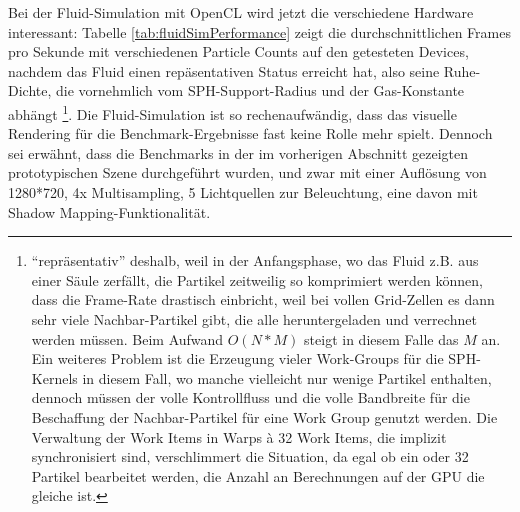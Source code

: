 	Bei der Fluid-Simulation mit OpenCL wird jetzt die verschiedene Hardware interessant:
	Tabelle \ref{tab:fluidSimPerformance} zeigt die durchschnittlichen Frames pro Sekunde
	mit verschiedenen Particle Counts auf den getesteten Devices, nachdem das Fluid einen repäsentativen
	Status erreicht hat, also seine Ruhe-Dichte, die vornehmlich vom SPH-Support-Radius und der Gas-Konstante abhängt
	\footnote{"`repräsentativ"' deshalb, weil in der Anfangsphase, wo das Fluid z.B. aus einer Säule zerfällt, die Partikel
	zeitweilig so komprimiert werden können, dass die Frame-Rate drastisch einbricht, weil bei vollen Grid-Zellen
	es dann sehr viele Nachbar-Partikel gibt, die alle heruntergeladen und verrechnet werden müssen.
	Beim Aufwand $O(N*M)$ steigt in diesem Falle das $M$ an. Ein weiteres Problem ist die Erzeugung vieler Work-Groups
	für die SPH-Kernels in diesem Fall, wo manche vielleicht nur wenige Partikel enthalten, 
	dennoch müssen der volle Kontrollfluss und die volle Bandbreite für die Beschaffung der Nachbar-Partikel 
	für eine Work Group genutzt werden. Die Verwaltung der Work Items in Warps à 32 Work Items, 
	die implizit synchronisiert sind, verschlimmert die Situation, da egal ob ein oder 32 Partikel 
	bearbeitet werden, die Anzahl an Berechnungen auf der GPU die gleiche ist.}.
	Die Fluid-Simulation ist so rechenaufwändig, dass das visuelle Rendering für die Benchmark-Ergebnisse fast keine 
	Rolle mehr spielt. Dennoch sei erwähnt, dass die Benchmarks in der im vorherigen Abschnitt gezeigten prototypischen
	Szene durchgeführt wurden, und zwar mit einer Auflösung von 1280*720, 4x Multisampling, 5 Lichtquellen zur Beleuchtung,
	eine davon mit Shadow Mapping-Funktionalität.
	
